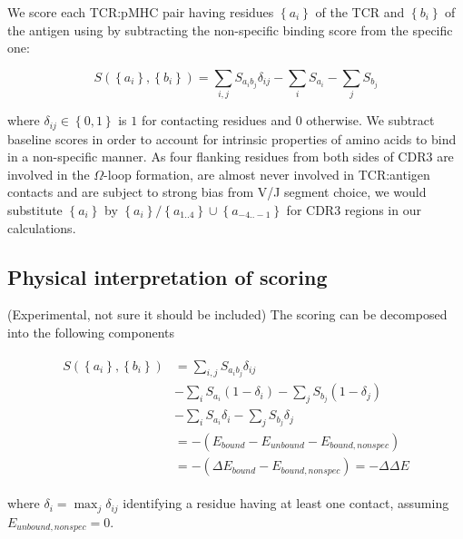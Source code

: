 \documentclass{article}
\begin{document}
We score each TCR:pMHC pair having residues $\left\{a_i\right\}$ of the TCR and $\left\{b_i\right\}$ of the antigen using by subtracting the non-specific binding score from the specific one:

\begin{equation}
S\left(\left\{a_i\right\},\left\{b_i\right\}\right)=\sum_{i,j} S_{a_{i}b_{j}} \delta_{ij} - \sum_{i} S_{a_{i}} - \sum_{j} S_{b_{j}}
\end{equation}

where $\delta_{ij} \in \left\{0, 1\right\}$ is $1$ for contacting residues and $0$ otherwise. We subtract baseline scores in order to account for intrinsic properties of amino acids to bind in a non-specific manner. As four flanking residues from both sides of CDR3 are involved in the $\Omega$-loop formation, are almost never involved in TCR:antigen contacts and are subject to strong bias from V/J segment choice, we would substitute $\left\{a_i\right\}$ by $\left\{a_i\right\} / \left\{a_{1..4}\right\} \cup \left\{a_{-4..-1}\right\}$ for CDR3 regions in our calculations.

\subsection{Physical interpretation of scoring}

(Experimental, not sure it should be included) The scoring can be decomposed into the following components

\begin{align}
\begin{split}
S\left(\left\{a_i\right\},\left\{b_i\right\}\right) &= \sum_{i,j} S_{a_{i}b_{j}} \delta_{ij} \\ &- \sum_{i} S_{a_{i}} \left(1 - \delta_i\right) - \sum_{j} S_{b_{j}} \left(1 - \delta_j\right) \\ &- \sum_{i} S_{a_{i}} \delta_i - \sum_{j} S_{b_{j}} \delta_j \\
 &= -\left(E_{bound} - E_{unbound} - E_{bound,nonspec}\right) \\
 &= -\left(\Delta E_{bound} - E_{bound,nonspec}\right) = -\Delta \Delta E
\end{split}
\end{align}

where $\delta_i = \max_{j} \delta_{ij}$ identifying a residue having at least one contact, assuming $E_{unbound,nonspec}=0$.
\end{document}
